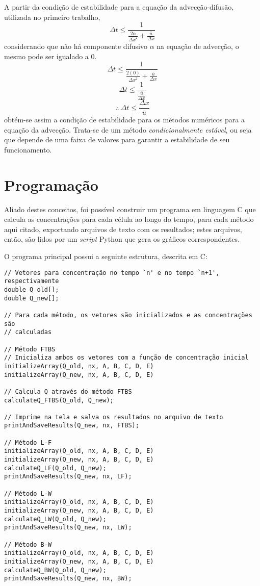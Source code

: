 A partir da condição de estabilidade para a equação da advecção-difusão,
utilizada no primeiro trabalho,
\begin{equation}
    \Delta t
    \leq
    \frac{1}{\frac{2\alpha}{{\Delta x}^2} + \frac{\bar{u}}{\Delta x}}
\end{equation}
considerando que não há componente difusivo $\alpha$ na equação de advecção, o
mesmo pode ser igualado a 0.
\[
    \Delta t
    \leq
    \frac{1}{\frac{2(0)}{{\Delta x}^2} + \frac{\bar{u}}{\Delta x}}
\]
\[
    \Delta t \leq \frac{1}{\frac{\bar{u}}{\Delta x}}
\]
\begin{equation}
    \therefore\ \Delta t \leq \frac{\Delta x}{\bar{u}}
\end{equation}
obtém-se assim a condição de estabilidade para os métodos numéricos para a
equação da advecção. Trata-se de um método \emph{condicionalmente estável}, ou
seja que depende de uma faixa de valores para garantir a estabilidade de seu
funcionamento.

\section{Programação}
Aliado destes conceitos, foi possível construir um programa em linguagem C que
calcula as concentrações para cada célula ao longo do tempo, para cada método
aqui citado, exportando arquivos de texto com os resultados; estes arquivos,
então, são lidos por um \textit{script} Python que gera os gráficos
correspondentes.

O programa principal possui a seguinte estrutura, descrita em C:

\begin{Verbatim}[fontsize=\footnotesize]
// Vetores para concentração no tempo `n' e no tempo `n+1', respectivamente
double Q_old[];
double Q_new[];

// Para cada método, os vetores são inicializados e as concentrações são
// calculadas

// Método FTBS
// Inicializa ambos os vetores com a função de concentração inicial
initializeArray(Q_old, nx, A, B, C, D, E)
initializeArray(Q_new, nx, A, B, C, D, E)

// Calcula Q através do método FTBS
calculateQ_FTBS(Q_old, Q_new);

// Imprime na tela e salva os resultados no arquivo de texto
printAndSaveResults(Q_new, nx, FTBS);

// Método L-F
initializeArray(Q_old, nx, A, B, C, D, E)
initializeArray(Q_new, nx, A, B, C, D, E)
calculateQ_LF(Q_old, Q_new);
printAndSaveResults(Q_new, nx, LF);

// Método L-W
initializeArray(Q_old, nx, A, B, C, D, E)
initializeArray(Q_new, nx, A, B, C, D, E)
calculateQ_LW(Q_old, Q_new);
printAndSaveResults(Q_new, nx, LW);

// Método B-W
initializeArray(Q_old, nx, A, B, C, D, E)
initializeArray(Q_new, nx, A, B, C, D, E)
calculateQ_BW(Q_old, Q_new);
printAndSaveResults(Q_new, nx, BW);
\end{Verbatim}

